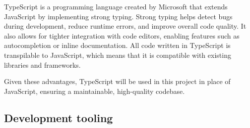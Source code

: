 TypeScript is a programming language created by Microsoft that extends JavaScript by implementing strong typing. Strong typing helps detect bugs during development, reduce runtime errors, and improve overall code quality. It also allows for tighter integration with code editors, enabling features such as autocompletion or inline documentation. All code written in TypeScript is transpilable to JavaScript, which means that it is compatible with existing libraries and frameworks. \cite{TypeScript}

Given these advantages, TypeScript will be used in this project in place of JavaScript, ensuring a maintainable, high-quality codebase.

\subsection{Development tooling}
